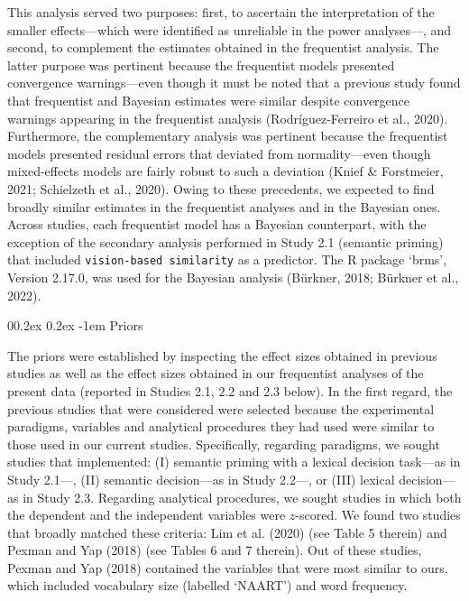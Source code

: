 \documentclass[
  12pt,
  man,floatsintext]{apa7}
\makeatletter
\let\oldparagraph\paragraph
\renewcommand{\paragraph}[1]{\oldparagraph{#1}\mbox{}}
\renewcommand{\paragraph}{\@startsection{paragraph}{4}{\parindent}%
  {0\baselineskip \@plus 0.2ex \@minus 0.2ex}%
  {-1em}%
  {\normalfont\normalsize\bfseries\itshape\typesectitle}}
\makeatother
\begin{document}
This analysis served two purposes: first, to ascertain the interpretation of the smaller effects---which were identified as unreliable in the power analyses---, and second, to complement the estimates obtained in the frequentist analysis. The latter purpose was pertinent because the frequentist models presented convergence warnings---even though it must be noted that a previous study found that frequentist and Bayesian estimates were similar despite convergence warnings appearing in the frequentist analysis (Rodríguez-Ferreiro et al., 2020). Furthermore, the complementary analysis was pertinent because the frequentist models presented residual errors that deviated from normality---even though mixed-effects models are fairly robust to such a deviation (Knief \& Forstmeier, 2021; Schielzeth et al., 2020). Owing to these precedents, we expected to find broadly similar estimates in the frequentist analyses and in the Bayesian ones. Across studies, each frequentist model has a Bayesian counterpart, with the exception of the secondary analysis performed in Study 2.1 (semantic priming) that included \texttt{vision-based\ similarity} as a predictor. The R package `brms', Version 2.17.0, was used for the Bayesian analysis (Bürkner, 2018; Bürkner et al., 2022).

\hypertarget{priors}{%
\paragraph{Priors}\label{priors}}

The priors were established by inspecting the effect sizes obtained in previous studies as well as the effect sizes obtained in our frequentist analyses of the present data (reported in Studies 2.1, 2.2 and 2.3 below). In the first regard, the previous studies that were considered were selected because the experimental paradigms, variables and analytical procedures they had used were similar to those used in our current studies. Specifically, regarding paradigms, we sought studies that implemented: (I) semantic priming with a lexical decision task---as in Study 2.1---, (II) semantic decision---as in Study 2.2---, or (III) lexical decision---as in Study 2.3. Regarding analytical procedures, we sought studies in which both the dependent and the independent variables were \(z\)-scored. We found two studies that broadly matched these criteria: Lim et al. (2020) (see Table 5 therein) and Pexman and Yap (2018) (see Tables 6 and 7 therein). Out of these studies, Pexman and Yap (2018) contained the variables that were most similar to ours, which included vocabulary size (labelled `NAART') and word frequency.
\end{document}
